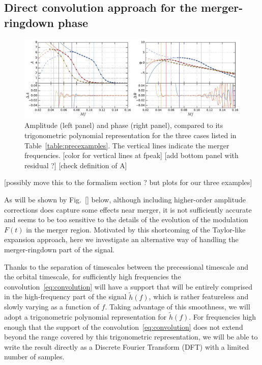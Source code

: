 \documentclass[aps,showpacs,twocolumn,
prd,superscriptaddress,nofootinbib]{revtex4-1}
\newcommand{\SM}[1]{{\color{Red} #1}}
\begin{document}

\subsection{Direct convolution approach for the merger-ringdown phase}
\label{subsec:trigopoly}

\begin{figure}
  \centering
  \includegraphics[width=.98\linewidth]{plots/trigopoly_py.pdf}
  \caption{Amplitude (left panel) and phase (right panel), compared to its trigonometric polynomial representation for the three cases listed in Table~\ref{table:precexamples}. The vertical lines indicate the merger frequencies. \SM{[color for vertical lines at fpeak]} \SM{[add bottom panel with residual ?]} \SM{[check definition of A]}}
  \label{fig:trigopoly}
\end{figure}

\SM{[possibly move this to the formalism section ? but plots for our three examples]}

As will be shown by Fig.~\ref{} below, although including higher-order amplitude corrections does capture some effects near merger, it is not sufficiently accurate and seems to be too sensitive to the details of the evolution of the modulation $F(t)$ in the merger region. Motivated by this shortcoming of the Taylor-like expansion approach, here we investigate an alternative way of handling the merger-ringdown part of the signal.

Thanks to the separation of timescales between the precessional timescale and the orbital timescale, for sufficiently high frequencies the convolution~\eqref{eq:convolution} will have a support that will be entirely comprised in the high-frequency part of the signal $\tilde{h}(f)$, which is rather featureless and slowly varying as a function of $f$. Taking advantage of this smoothness, we will adopt a trigonometric polynomial representation for $\tilde{h}(f)$. For frequencies high enough that the support of the convolution~\eqref{eq:convolution} does not extend beyond the range covered by this trigonometric representation, we will be able to write the result directly as a Discrete Fourier Transform (DFT) with a limited number of samples.
\end{document}
